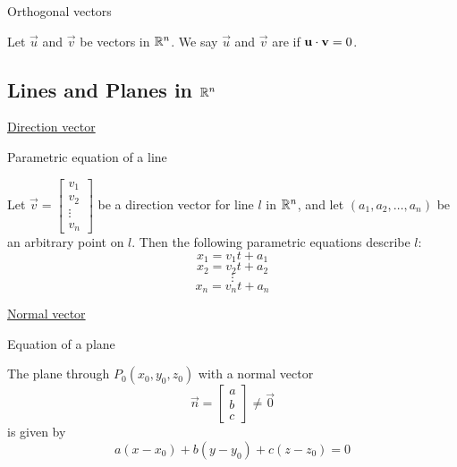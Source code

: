 \documentclass{ximera}
\begin{document}
Orthogonal vectors
\begin{expandable}
Let $\vec{u}$ and $\vec{v}$ be vectors in $\mathbb{R}^n$. We say $\vec{u}$ and $\vec{v}$ are  if $\mathbf{u}\cdot \mathbf{v}=0$.
\end{expandable}

\subsection{Lines and Planes in $\mathbb{R}^n$}

\href{https://ximera.osu.edu/oerlinalg/LinearAlgebra/RRN-0020/main}{Direction vector}

Parametric equation of a line 
\begin{expandable}
    Let $\vec{v}=\begin{bmatrix}v_1\\v_2\\\vdots\\v_n\end{bmatrix}$ be a direction vector for line $l$ in $\mathbb{R}^n$, and let $(a_1, a_2,\ldots , a_n)$ be an arbitrary point on $l$.  Then the following parametric equations describe $l$:
\[
x_1=v_1t+a_1\]
\[x_2=v_2t+a_2\]
\[\vdots\]
\[x_n=v_nt+a_n
\]
\end{expandable}

\href{https://ximera.osu.edu/oerlinalg/LinearAlgebra/RRN-0030/main}{Normal vector}

Equation of a plane
\begin{expandable}
The plane through $P_{0}(x_{0}, y_{0}, z_{0})$ with a normal vector $$\vec{n} = 
\begin{bmatrix}
a\\
b\\
c
\end{bmatrix}\neq\vec{0}$$
 is given by
$$a(x - x_{0}) + b(y - y_{0}) + c(z - z_{0}) = 0$$
\end{expandable}
\end{document}
